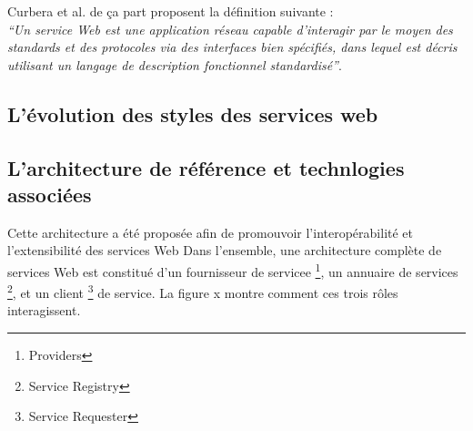     
    
    
    Curbera et al. \cite{curbera2001web} de ça part proposent la définition suivante :\\
    
    \emph{``Un service Web est une application réseau capable d'interagir
      par le moyen des standards et des protocoles via des interfaces bien
      spécifiés, dans lequel est décris utilisant un langage de
      description fonctionnel
      standardisé''}.\\


    \subsection{L'évolution des styles des services web}
    \label{sec:levol-des-styl}

    
    \newpage
    \subsection{L'architecture de référence et technlogies associées}
    \cite{curbera2002unraveling} \cite{gottschalk2002introduction}
    \cite{kreger2001web} \cite{WSA}
    Cette architecture a été proposée afin de promouvoir
    l’interopérabilité et l’extensibilité des services Web Dans
    l'ensemble, une architecture complète de services Web est
    constitué d'un fournisseur de servicee \footnote{Providers}, un
    annuaire de services \footnote{Service Registry}, et un client
    \footnote{Service Requester} de service.  La figure x montre comment 
    ces trois rôles interagissent.\\

